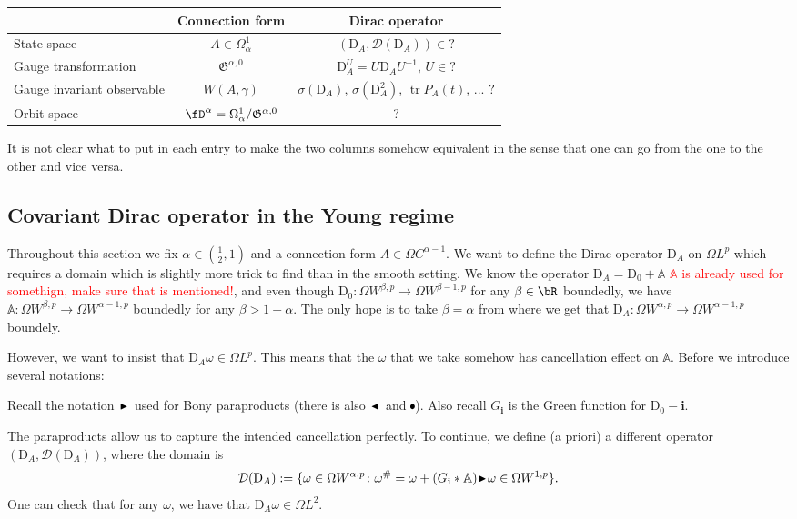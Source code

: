 \documentclass[12pt]{article}
\numberwithin{equation}{section}
\theoremstyle{definition}
\theoremstyle{remark}
\newcommand{\1}{\mathbf 1}
\newcommand{\<}{\langle}
\renewcommand{\>}{\rangle}
\newcommand{\tr}{\operatorname{tr}}
\newcommand{\rdom}{{\hspace{1pt}\scalebox{0.8}{\raisebox{0.65pt}{$\blacktriangleleft$}}\hspace{1pt}}}
\newcommand{\ldom}{{\hspace{1pt}\scalebox{0.8}{\raisebox{0.65pt}{$\blacktriangleright$}}\hspace{1pt}}}
\newcommand{\res}{\hspace{-1.2pt}\bullet\hspace{-1.2pt}}
\newcommand{\red}[1]{\textcolor{red}{#1}}
\newcommand{\bA}{\mathbb A}
\newcommand{\bfi}{\mathbf i}
\newcommand{\cD}{\mathcal D}
\newcommand{\rmD}{\mathrm{D}}
\newcommand{\fG}{\mathfrak{G}}
\begin{document}
\begin{center}
\begin{tabular}{l|c|c}
    & Connection form & Dirac operator  \\ \hline 
     State space & $A\in \Omega^1_\alpha$ & $(\rmD_A,\cD(\rmD_A))\in ?$\\
     Gauge transformation & $\fG^{\alpha,0}$ & $\rmD_A^U=U\rmD_AU^{-1}$, $U\in ?$ \\  
     Gauge invariant observable & $W(A,\gamma)$ & $\sigma(\rmD_A)$, $\sigma(\rmD_A^2)$, $\tr P_A(t)$, ... $?$\\ 
    Orbit space & $\fD^\alpha=\Omega^1_\alpha/\fG^{\alpha,0}$ & ? 
\end{tabular}
\end{center}
It is not clear what to put in each entry to make the two columns somehow equivalent in the sense that one can go from the one to the other and vice versa. 

\subsection{Covariant Dirac operator in the Young regime}
Throughout this section we fix $\alpha\in (\frac 1 2,1)$ and a connection form $A\in\Omega C^{\alpha-1}$. We want to define the Dirac operator $\rmD_A$ on $\Omega L^p$ which requires a domain which is slightly more trick to find than in the smooth setting. We know the operator $\rmD_A=\rmD_0+\bA$ \red{$\bA$ is already used for somethign, make sure that is mentioned!}, and even though $\rmD_0:\Omega W^{\beta,p}\to\Omega W^{\beta-1,p}$ for any $\beta\in\bR$ boundedly, we have $\bA:\Omega W^{\beta,p}\to \Omega W^{\alpha-1,p}$ boundedly for any $\beta> 1-\alpha$. The only hope is to take $\beta=\alpha$ from where we get that $\rmD_A:\Omega W^{\alpha,p}\to\Omega W^{\alpha-1,p}$ boundely. 

However, we want to insist that $\rmD_A\omega\in\Omega L^p$. This means that the $\omega$ that we take somehow has cancellation effect on $\bA$. Before we introduce several notations:

    Recall the notation $\ldom$ used for Bony paraproducts (there is also $\rdom$ and $\res$). Also recall $G_\bfi$ is the Green function for $\rmD_0-\bfi$. 


The paraproducts allow us to capture the intended cancellation perfectly. To continue, we define (a priori) a different operator $(\rmD_A,\cD(\rmD_A))$, where the domain is 
\[
\cD(\rmD_A):=\{\omega\in\Omega W^{\alpha,p}\colon \omega^\#=\omega+(G_\bfi*\bA)\ldom \omega\in \Omega W^{1,p}\}.
\]
One can check that for any $\omega$, we have that $\rmD_A\omega\in \Omega L^2$. 
\end{document}
